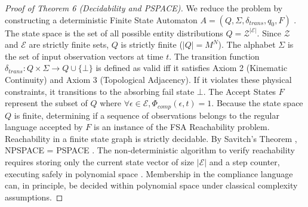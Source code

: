 \documentclass[conference]{IEEEtran}
\newcommand{\E}{\mathcal{E}} %
\newcommand{\Z}{\mathcal{Z}} %
\newcommand{\fail}{\bot} %
\begin{document}
\begin{proof}[Proof of Theorem 6 (Decidability and PSPACE)]
We reduce the problem by constructing a deterministic Finite State Automaton $A = (Q, \Sigma, \delta_{trans}, q_0, F)$ \cite{b5}. The state space is the set of all possible entity distributions $Q = \Z^{|\E|}$. Since $\Z$ and $\E$ are strictly finite sets, $Q$ is strictly finite ($|Q| = M^N$). The alphabet $\Sigma$ is the set of input observation vectors at time $t$. The transition function $\delta_{trans}: Q \times \Sigma \to Q \cup \{\fail\}$ is defined as valid iff it satisfies Axiom 2 (Kinematic Continuity) and Axiom 3 (Topological Adjacency). If it violates these physical constraints, it transitions to the absorbing fail state $\fail$. The Accept States $F$ represent the subset of $Q$ where $\forall \epsilon \in \E, \Phi_{comp}(\epsilon, t) = 1$. Because the state space $Q$ is finite, determining if a sequence of observations belongs to the regular language accepted by $F$ is an instance of the FSA Reachability problem. Reachability in a finite state graph is strictly decidable. By Savitch's Theorem \cite{b7}, NPSPACE = PSPACE \cite{b22}. The non-deterministic algorithm to verify reachability requires storing only the current state vector of size $|\E|$ and a step counter, executing safely in polynomial space \cite{b23}. Membership in the compliance language can, in principle, be decided within polynomial space under classical complexity assumptions.
\end{proof}
\end{document}
